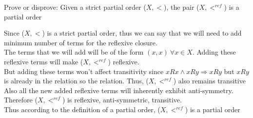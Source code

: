 \documentclass[12pt]{article}
\newenvironment{solution}[2][Solution]{ \begin{trivlist}
\item[\hskip \labelsep {\bfseries #1}]}{\end{trivlist}}
\newenvironment{problem}[2][Problem]{\begin{trivlist}
\item[\hskip \labelsep {\bfseries #1}\hskip \labelsep {\bfseries #2.}]}{\end{trivlist}}
\begin{document}
\vskip 0.5in

\begin{problem}{6}Prove or disprove: Given a strict partial order ($X,<$), the pair ($X,<^{ref}$) is a partial order

\end{problem}
\begin{solution}{6}
Since ($X,<$) is a strict partial order, thus we can say that we will need to add minimum number of terms for the reflexive closure.\\ The terms that we will add will be of the form $(x,x)\ \forall x \in X$.
Adding these reflexive terms will make ($X,<^{ref}$) reflexive. \\
But adding these terms won't affect transitivity since $xRx \wedge xRy \Rightarrow xRy$ but $xRy$ is already in the relation so the relation. Thus, ($X,<^{ref}$) also remains transitive
\\
Also all the new added reflexive terms will inherently exhibit anti-symmetry.
\\
Therefore ($X,<^{ref}$) is reflexive, anti-symmetric, transitive.
\\
Thus according to the definition of a partial order,  ($X,<^{ref}$) is a partial order
\end{solution}

\pagebreak
\end{document}
